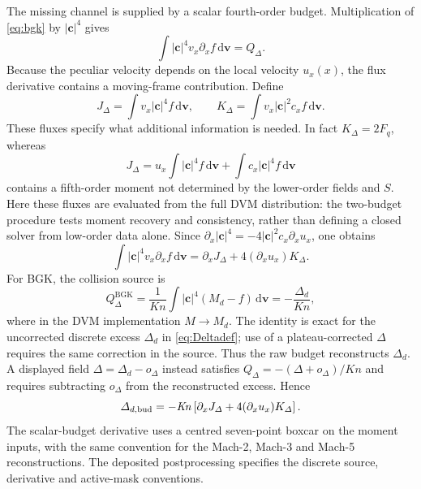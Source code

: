 \documentclass[lineno,paper]{JFM-FLM_Au}
\newenvironment{revision}{\begingroup\colorlet{shadecolor}{revisionyellow}\begin{shaded}}{\end{shaded}\endgroup}
\newenvironment{revision}{}{}
\newcommand{\Kn}{\mathit{Kn}}
\newcommand{\dd}{\mathrm{d}}
\begin{document}
\begin{revision}
The missing channel is supplied by a scalar fourth-order budget.  Multiplication of \eqref{eq:bgk} by $|\boldsymbol c|^4$ gives
\begin{equation}
  \int |\boldsymbol c|^4 v_x\partial_x f\,\dd\boldsymbol v = Q_\Delta .
  \label{eq:delta_raw}
\end{equation}
Because the peculiar velocity depends on the local velocity $u_x(x)$, the flux derivative contains a moving-frame contribution.  Define
\begin{equation}
  J_\Delta=\int v_x|\boldsymbol c|^4 f\,\dd\boldsymbol v,
  \qquad
  K_\Delta=\int v_x|\boldsymbol c|^2 c_x f\,\dd\boldsymbol v .
  \label{eq:J_K_delta}
\end{equation}
These fluxes specify what additional information is needed. In fact $K_\Delta=2F_q$, whereas
\[
 J_\Delta=u_x\int |\boldsymbol c|^4f\,\dd\boldsymbol v
             +\int c_x|\boldsymbol c|^4f\,\dd\boldsymbol v
\]
contains a fifth-order moment not determined by the lower-order fields and $S$. Here these fluxes are evaluated from the full DVM distribution: the two-budget procedure tests moment recovery and consistency, rather than defining a closed solver from low-order data alone. Since $\partial_x|\boldsymbol c|^4=-4|\boldsymbol c|^2c_x\partial_xu_x$, one obtains
\begin{equation}
  \int |\boldsymbol c|^4 v_x\partial_x f\,\dd\boldsymbol v
  =\partial_x J_\Delta+4(\partial_xu_x)K_\Delta .
  \label{eq:delta_flux_identity}
\end{equation}
For BGK, the collision source is
\begin{equation}
  Q_\Delta^{\mathrm{BGK}}=\frac{1}{\Kn}\int |\boldsymbol c|^4(M_d-f)\,\dd\boldsymbol v=-\frac{\Delta_d}{\Kn} ,
  \label{eq:delta_bgk_source}
\end{equation}
where in the DVM implementation $M\to M_d$. The identity is exact for the uncorrected discrete excess $\Delta_d$ in \eqref{eq:Deltadef}; use of a plateau-corrected $\Delta$ requires the same correction in the source. Thus the raw budget reconstructs $\Delta_d$. A displayed field $\Delta=\Delta_d-o_\Delta$ instead satisfies $Q_\Delta=-(\Delta+o_\Delta)/\Kn$ and requires subtracting $o_\Delta$ from the reconstructed excess. Hence
\begin{equation}
  \Delta_{d,\rm bud}=-\Kn\left[\partial_xJ_\Delta+4(\partial_xu_x)K_\Delta\right].
  \label{eq:delta_rec}
\end{equation}
The scalar-budget derivative uses a centred seven-point boxcar on the moment inputs, with the same convention for the Mach-2, Mach-3 and Mach-5 reconstructions. The deposited postprocessing specifies the discrete source, derivative and active-mask conventions.
\end{revision}
\end{document}
